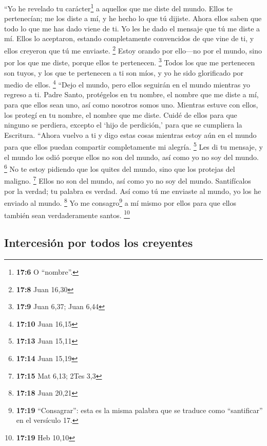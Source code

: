  ``Yo he revelado tu carácter\footnote{\textbf{17:6} O
  ``nombre''.} a aquellos que me diste del mundo. Ellos te pertenecían;
me los diste a mí, y he hecho lo que tú dijiste.  Ahora
ellos saben que todo lo que me has dado viene de ti.  Yo
les he dado el mensaje que tú me diste a mí. Ellos lo aceptaron, estando
completamente convencidos de que vine de ti, y ellos creyeron que tú me
enviaste. \footnote{\textbf{17:8} Juan 16,30}  Estoy
orando por ello---no por el mundo, sino por los que me diste, porque
ellos te pertenecen. \footnote{\textbf{17:9} Juan 6,37; Juan 6,44}
 Todos los que me pertenecen son tuyos, y los que te
pertenecen a ti son míos, y yo he sido glorificado por medio de ellos.
\footnote{\textbf{17:10} Juan 16,15}  ``Dejo el mundo,
pero ellos seguirán en el mundo mientras yo regreso a ti. Padre Santo,
protégelos en tu nombre, el nombre que me diste a mí, para que ellos
sean uno, así como nosotros somos uno.  Mientras estuve
con ellos, los protegí en tu nombre, el nombre que me diste. Cuidé de
ellos para que ninguno se perdiera, excepto el `hijo de perdición,' para
que se cumpliera la Escritura.  ``Ahora vuelvo a ti y
digo estas cosas mientras estoy aún en el mundo para que ellos puedan
compartir completamente mi alegría. \footnote{\textbf{17:13} Juan 15,11}
 Les di tu mensaje, y el mundo los odió porque ellos no
son del mundo, así como yo no soy del mundo. \footnote{\textbf{17:14}
  Juan 15,19}  No te estoy pidiendo que los quites del
mundo, sino que los protejas del maligno. \footnote{\textbf{17:15} Mat
  6,13; 2Tes 3,3}  Ellos no son del mundo, así como yo no
soy del mundo.  Santifícalos por la verdad; tu palabra es
verdad.  Así como tú me enviaste al mundo, yo los he
enviado al mundo. \footnote{\textbf{17:18} Juan 20,21} 
Yo me consagro\footnote{\textbf{17:19} ``Consagrar'': esta es la misma
  palabra que se traduce como ``santificar'' en el versículo 17.} a mí
mismo por ellos para que ellos también sean verdaderamente santos.
\footnote{\textbf{17:19} Heb 10,10}

\hypertarget{intercesiuxf3n-por-todos-los-creyentes}{%
\subsection{Intercesión por todos los
creyentes}\label{intercesiuxf3n-por-todos-los-creyentes}}

